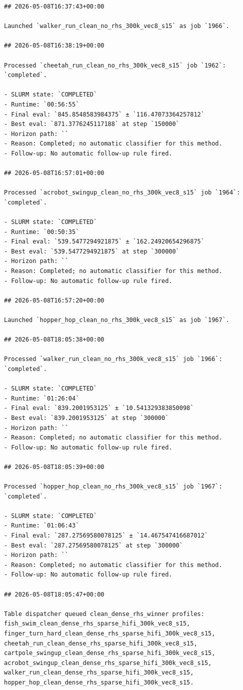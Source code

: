 \begin{verbatim}
## 2026-05-08T16:37:43+00:00

Launched `walker_run_clean_no_rhs_300k_vec8_s15` as job `1966`.

## 2026-05-08T16:38:19+00:00

Processed `cheetah_run_clean_no_rhs_300k_vec8_s15` job `1962`: `completed`.

- SLURM state: `COMPLETED`
- Runtime: `00:56:55`
- Final eval: `845.8548583984375` ± `116.47073364257812`
- Best eval: `871.3776245117188` at step `150000`
- Horizon path: ``
- Reason: Completed; no automatic classifier for this method.
- Follow-up: No automatic follow-up rule fired.

## 2026-05-08T16:57:01+00:00

Processed `acrobot_swingup_clean_no_rhs_300k_vec8_s15` job `1964`: `completed`.

- SLURM state: `COMPLETED`
- Runtime: `00:50:35`
- Final eval: `539.5477294921875` ± `162.24920654296875`
- Best eval: `539.5477294921875` at step `300000`
- Horizon path: ``
- Reason: Completed; no automatic classifier for this method.
- Follow-up: No automatic follow-up rule fired.

## 2026-05-08T16:57:20+00:00

Launched `hopper_hop_clean_no_rhs_300k_vec8_s15` as job `1967`.

## 2026-05-08T18:05:38+00:00

Processed `walker_run_clean_no_rhs_300k_vec8_s15` job `1966`: `completed`.

- SLURM state: `COMPLETED`
- Runtime: `01:26:04`
- Final eval: `839.2001953125` ± `10.541329383850098`
- Best eval: `839.2001953125` at step `300000`
- Horizon path: ``
- Reason: Completed; no automatic classifier for this method.
- Follow-up: No automatic follow-up rule fired.

## 2026-05-08T18:05:39+00:00

Processed `hopper_hop_clean_no_rhs_300k_vec8_s15` job `1967`: `completed`.

- SLURM state: `COMPLETED`
- Runtime: `01:06:43`
- Final eval: `287.27569580078125` ± `14.467547416687012`
- Best eval: `287.27569580078125` at step `300000`
- Horizon path: ``
- Reason: Completed; no automatic classifier for this method.
- Follow-up: No automatic follow-up rule fired.

## 2026-05-08T18:05:47+00:00

Table dispatcher queued clean_dense_rhs_winner profiles: fish_swim_clean_dense_rhs_sparse_hifi_300k_vec8_s15, finger_turn_hard_clean_dense_rhs_sparse_hifi_300k_vec8_s15, cheetah_run_clean_dense_rhs_sparse_hifi_300k_vec8_s15, cartpole_swingup_clean_dense_rhs_sparse_hifi_300k_vec8_s15, acrobot_swingup_clean_dense_rhs_sparse_hifi_300k_vec8_s15, walker_run_clean_dense_rhs_sparse_hifi_300k_vec8_s15, hopper_hop_clean_dense_rhs_sparse_hifi_300k_vec8_s15.


\end{verbatim}
